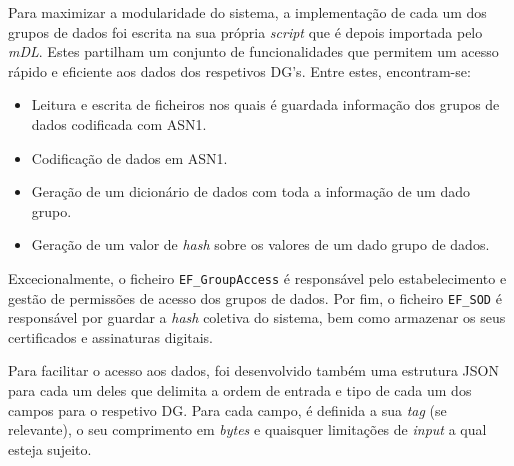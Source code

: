 
Para maximizar a modularidade do sistema, a implementação de cada um dos grupos de dados foi escrita na sua própria \textit{script} que é depois importada pelo \textit{mDL}. Estes partilham um conjunto de funcionalidades que permitem um acesso rápido e eficiente aos dados dos respetivos DG's. Entre estes, encontram-se:

\begin{itemize}
    \item Leitura e escrita de ficheiros nos quais é guardada informação dos grupos de dados codificada com ASN1.
    \item Codificação de dados em ASN1.
    \item Geração de um dicionário de dados com toda a informação de um dado grupo.
    \item Geração de um valor de \textit{hash} sobre os valores de um dado grupo de dados.
\end{itemize}

Excecionalmente, o ficheiro \texttt{EF_GroupAccess} é responsável pelo estabelecimento e gestão de permissões de acesso dos grupos de dados. Por fim, o ficheiro \texttt{EF_SOD} é responsável por guardar a \textit{hash} coletiva do sistema, bem como armazenar os seus certificados e assinaturas digitais.

Para facilitar o acesso aos dados, foi desenvolvido também uma estrutura JSON para cada um deles que delimita a ordem de entrada e tipo de cada um dos campos para o respetivo DG. Para cada campo, é definida a sua \textit{tag} (se relevante), o seu comprimento em \textit{bytes} e quaisquer limitações de \textit{input} a qual esteja sujeito.


